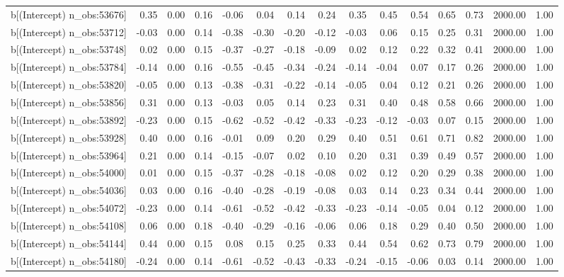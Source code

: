 \begin{table}[ht]
\begin{tabular}{rrrrrrrrrrrrrrr}
  b[(Intercept) n\_obs:53676] & 0.35 & 0.00 & 0.16 & -0.06 & 0.04 & 0.14 & 0.24 & 0.35 & 0.45 & 0.54 & 0.65 & 0.73 & 2000.00 & 1.00 \\ 
  b[(Intercept) n\_obs:53712] & -0.03 & 0.00 & 0.14 & -0.38 & -0.30 & -0.20 & -0.12 & -0.03 & 0.06 & 0.15 & 0.25 & 0.31 & 2000.00 & 1.00 \\ 
  b[(Intercept) n\_obs:53748] & 0.02 & 0.00 & 0.15 & -0.37 & -0.27 & -0.18 & -0.09 & 0.02 & 0.12 & 0.22 & 0.32 & 0.41 & 2000.00 & 1.00 \\ 
  b[(Intercept) n\_obs:53784] & -0.14 & 0.00 & 0.16 & -0.55 & -0.45 & -0.34 & -0.24 & -0.14 & -0.04 & 0.07 & 0.17 & 0.26 & 2000.00 & 1.00 \\ 
  b[(Intercept) n\_obs:53820] & -0.05 & 0.00 & 0.13 & -0.38 & -0.31 & -0.22 & -0.14 & -0.05 & 0.04 & 0.12 & 0.21 & 0.26 & 2000.00 & 1.00 \\ 
  b[(Intercept) n\_obs:53856] & 0.31 & 0.00 & 0.13 & -0.03 & 0.05 & 0.14 & 0.23 & 0.31 & 0.40 & 0.48 & 0.58 & 0.66 & 2000.00 & 1.00 \\ 
  b[(Intercept) n\_obs:53892] & -0.23 & 0.00 & 0.15 & -0.62 & -0.52 & -0.42 & -0.33 & -0.23 & -0.12 & -0.03 & 0.07 & 0.15 & 2000.00 & 1.00 \\ 
  b[(Intercept) n\_obs:53928] & 0.40 & 0.00 & 0.16 & -0.01 & 0.09 & 0.20 & 0.29 & 0.40 & 0.51 & 0.61 & 0.71 & 0.82 & 2000.00 & 1.00 \\ 
  b[(Intercept) n\_obs:53964] & 0.21 & 0.00 & 0.14 & -0.15 & -0.07 & 0.02 & 0.10 & 0.20 & 0.31 & 0.39 & 0.49 & 0.57 & 2000.00 & 1.00 \\ 
  b[(Intercept) n\_obs:54000] & 0.01 & 0.00 & 0.15 & -0.37 & -0.28 & -0.18 & -0.08 & 0.02 & 0.12 & 0.20 & 0.29 & 0.38 & 2000.00 & 1.00 \\ 
  b[(Intercept) n\_obs:54036] & 0.03 & 0.00 & 0.16 & -0.40 & -0.28 & -0.19 & -0.08 & 0.03 & 0.14 & 0.23 & 0.34 & 0.44 & 2000.00 & 1.00 \\ 
  b[(Intercept) n\_obs:54072] & -0.23 & 0.00 & 0.14 & -0.61 & -0.52 & -0.42 & -0.33 & -0.23 & -0.14 & -0.05 & 0.04 & 0.12 & 2000.00 & 1.00 \\ 
  b[(Intercept) n\_obs:54108] & 0.06 & 0.00 & 0.18 & -0.40 & -0.29 & -0.16 & -0.06 & 0.06 & 0.18 & 0.29 & 0.40 & 0.50 & 2000.00 & 1.00 \\ 
  b[(Intercept) n\_obs:54144] & 0.44 & 0.00 & 0.15 & 0.08 & 0.15 & 0.25 & 0.33 & 0.44 & 0.54 & 0.62 & 0.73 & 0.79 & 2000.00 & 1.00 \\ 
  b[(Intercept) n\_obs:54180] & -0.24 & 0.00 & 0.14 & -0.61 & -0.52 & -0.43 & -0.33 & -0.24 & -0.15 & -0.06 & 0.03 & 0.14 & 2000.00 & 1.00 \\ 

\end{tabular}
\end{table}

